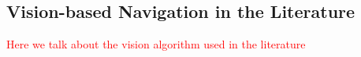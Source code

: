 \subsection{Vision-based Navigation in the Literature}
\label{subsec:lit_vision}
\textcolor{red}{Here we talk about the vision algorithm used in the literature}